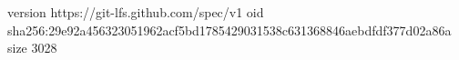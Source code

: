 version https://git-lfs.github.com/spec/v1
oid sha256:29e92a456323051962acf5bd1785429031538c631368846aebdfdf377d02a86a
size 3028
